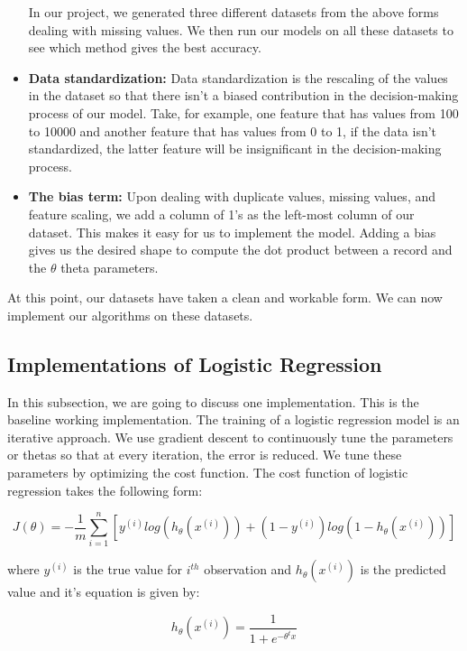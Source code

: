 \begin{itemize}
\begin{itemize}
        \end{itemize}
        In our project, we generated three different datasets from the above forms dealing with missing values. We then run our models on all these datasets to see which method gives the best accuracy.
    \item \textbf{Data standardization: }Data standardization is the rescaling of the values in the dataset so that there isn't a biased contribution in the decision-making process of our model. Take, for example, one feature that has values from 100 to 10000 and another feature that has values from 0 to 1, if the data isn't standardized, the latter feature will be insignificant in the decision-making process. 
    \item \textbf{The bias term: } Upon dealing with duplicate values, missing values, and feature scaling, we add a column of 1's as the left-most column of our dataset. This makes it easy for us to implement the model. Adding a bias gives us the desired shape to compute the dot product between a record and the $\theta$ theta parameters.
\end{itemize}
At this point, our datasets have taken a clean and workable form. We can now implement our algorithms on these datasets.

\subsection{Implementations of Logistic Regression}
In this subsection, we are going to discuss one implementation. This is the baseline working implementation. The training of a logistic regression model is an iterative approach. We use gradient descent to continuously tune the parameters or thetas so that at every iteration, the error is reduced. We tune these parameters by optimizing the cost function. The cost function of logistic regression takes the following form: 

\begin{equation}
    J(\theta) = -\frac{1}{m}\sum_{i=1}^{n}[y^{(i)}log(h_{\theta}(x^{(i)})) + (1-y^{(i)})log(1-h_{\theta}(x^{(i)}))]
\end{equation}

where $y^{(i)}$ is the true value for $i^{th}$ observation and $h_{\theta}(x^{(i)})$ is the predicted value and it's equation is given by:

\begin{equation}
    h_{\theta}(x^{(i)}) = \frac{1}{1 + e^{-\theta^tx}}
\end{equation}


